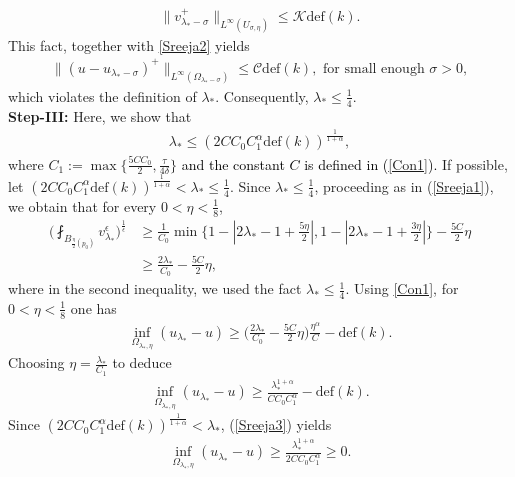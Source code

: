 \documentclass[11pt, notitlepage]{article}
\begin{document}
{{%
\begin{align*}
    \|v_{\lambda_*-\sigma}^+\|_{L^\infty(U_{\sigma,\eta})}\leq \mathcal{K}\mathrm{def}(k).
\end{align*}}
This fact, together with \eqref{Sreeja2} yields 
\begin{align}\label{contra}
    \|(u-u_{\lambda_*-\sigma})^+\|_{L^\infty(\Omega_{\lambda_*-\sigma})}\leq \mathcal{C} \mathrm{def}(k), \text{ for small enough } \sigma>0,
\end{align}
which violates the definition of $\lambda_*$. Consequently, $\lambda_*\leq \frac{1}{4}.$\\
\textbf{Step-III:} Here, we show that
\begin{align*}
    \lambda_*\leq (2CC_0C_1^\alpha\mathrm{def}(k))^\frac{1}{1+\alpha},
\end{align*}
where $C_1:=\max\{\frac{5CC_0}{2}, \frac{\tau}{4\delta}\}$ \textcolor{black}{and the constant $C$ is defined in (\ref{Con1}).} If possible, let $(2CC_0C_1^\alpha\mathrm{def}(k))^\frac{1}{1+\alpha}<\lambda_*\leq \frac{1}{4}$. Since $\lambda_*\leq \frac{1}{4}$, proceeding as in (\ref{Sreeja1}), we obtain that for every $0<\eta<\frac{1}{8}$, 
\begin{align}
     \Big(\fint_{B_{\frac{\eta}{2}(p_0)}}v_{\lambda_*}^\epsilon\Big)^\frac{1}{\epsilon}&\geq \frac{1}{C_0} \min\{{ 1-|2\lambda_*-1+\frac{5\eta}{2}|, 1-|2\lambda_*-1+\frac{3\eta}{2}|\}}-\frac{5C}{2}\eta\nonumber\\
     &\geq \frac{2\lambda_*}{C_0}-\frac{5C}{2}\eta,
\end{align}
where in the second inequality, we used the fact $\lambda_*\leq \frac{1}{4}$. Using \eqref{Con1}, for $0<\eta<\frac{1}{8}$ one has 
\begin{align*}
    \inf_{\Omega_{\lambda_*,\eta}}(u_{\lambda_*}-u)\geq \Big( \frac{2\lambda_*}{C_0}-\frac{5C}{2}\eta\Big)\frac{\eta^\alpha}{C}-\mathrm{def}(k).
\end{align*}
Choosing $\eta=\frac{\lambda_*}{C_1}$ to deduce
\begin{align}\label{Sreeja3}
     \inf_{\Omega_{\lambda_*,\eta}}(u_{\lambda_*}-u)\geq \frac{\lambda_*^{1+\alpha}}{CC_0C_1^\alpha}-\mathrm{def}(k).
\end{align}
Since $(2CC_0C_1^\alpha\mathrm{def}(k))^\frac{1}{1+\alpha}<\lambda_*$, (\ref{Sreeja3}) yields
\begin{align}\label{Sreeja4}
     \inf_{\Omega_{\lambda_*,\eta}}(u_{\lambda_*}-u)\geq \frac{\lambda_*^{1+\alpha}}{2CC_0C_1^\alpha}\geq 0.
\end{align}
}
\end{document}
